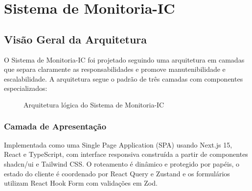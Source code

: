 \documentclass[portuguese]{sbc2025}%
\begin{document}
\section{Sistema de Monitoria-IC}
\label{sec:system}

\subsection{Visão Geral da Arquitetura}

O Sistema de Monitoria-IC foi projetado seguindo uma arquitetura em camadas que separa claramente as responsabilidades e promove manutenibilidade e escalabilidade. A arquitetura segue o padrão de três camadas com componentes especializados:

\begin{figure}[h!]
  \centering
  \caption{Arquitetura lógica do Sistema de Monitoria-IC}
  \label{fig:architecture}
\end{figure}

\subsubsection{Camada de Apresentação}

Implementada como uma Single Page Application (SPA) usando Next.js 15, React e TypeScript, com interface responsiva construída a partir de componentes shadcn/ui e Tailwind CSS. O roteamento é dinâmico e protegido por papéis, o estado do cliente é coordenado por React Query e Zustand e os formulários utilizam React Hook Form com validações em Zod.
\end{document}
